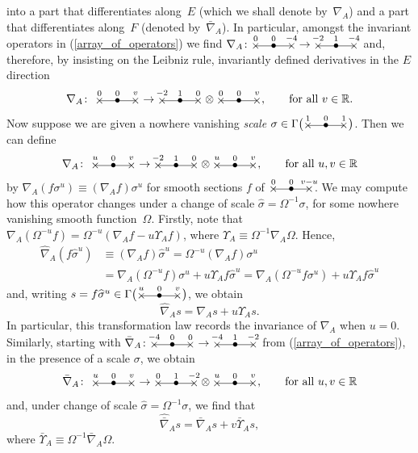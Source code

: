 \documentclass[10pt,a4paper]{amsart}
\numberwithin{equation}{section}
\newcommand{\xox}[3]{\begin{picture}(40,11)
\put(4,1.5){\makebox(0,0){$\times$}}
\put(20,1.5){\makebox(0,0){$\bullet$}}
\put(36,1.5){\makebox(0,0){$\times$}}
\put(4,1.5){\line(1,0){32}}
\put(4,8){\makebox(0,0){$\scriptstyle #1$}}
\put(20,8){\makebox(0,0){$\scriptstyle #2$}}
\put(36,8){\makebox(0,0){$\scriptstyle #3$}}
\end{picture}}
\begin{document}
into a part that differentiates along~$E$ (which we shall denote by~$\nabla_A$)
and a part that differentiates along~$F$ (denoted by~$\bar\nabla_A$). In
particular, amongst the invariant operators in (\ref{array_of_operators}) we
find $\nabla_A\colon \xox{0}{0}{-4}\to\xox{-2}{1}{-4}$ and, therefore, by insisting
on the Leibniz rule, invariantly defined derivatives in the $E$ direction
\[\nabla_A\colon \ \xox{0}{0}{v}\to\xox{-2}{1}{0}\otimes\xox{0}{0}{v},\qquad
\mbox{for all}\ v\in{\mathbb{R}}.\]
Now suppose we are given a nowhere vanishing {\em scale}
$\sigma\in\Gamma\big(\xox{1}{0}{1}\big)$. Then we can define
\begin{align}\label{densities}
\nabla_A\colon \ \xox{u}{0}{v} \to \xox{-2}{1}{0} \otimes \xox{u}{0}{v},\qquad
\mbox{for all}\ u,v\in{\mathbb{R}}
\end{align}
by $\nabla_A(f\sigma^u)\equiv(\nabla_A f)\sigma^u$ for smooth sections $f$ of
$\xox{0}{0}{v-u}$\;. We may compute how this operator changes under a change of
scale $\widehat\sigma=\Omega^{-1}\sigma$, for some nowhere vanishing
smooth function~$\Omega$. Firstly, note that
$\nabla_A(\Omega^{-u}f)=\Omega^{-u}(\nabla_A f-u\Upsilon_Af)$, where
$\Upsilon_A\equiv\Omega^{-1}\nabla_A\Omega$.
Hence,
\begin{align*}
\widehat\nabla_A(f\widehat\sigma^u)& \equiv (\nabla_A f)\widehat\sigma^u=
\Omega^{-u}(\nabla_A f)\sigma^u\\
& = \nabla_A(\Omega^{-u}f)\sigma^u+u\Upsilon_Af\widehat\sigma^u
=\nabla_A(\Omega^{-u}f\sigma^u)+u\Upsilon_Af\widehat\sigma^u
\end{align*}
and, writing $s=f\widehat\sigma^u\in\Gamma\big(\xox{u}{0}{v}\big)$, we obtain
\[\widehat\nabla_A s=\nabla_A s+u\Upsilon_As.\]
In particular, this transformation law records the invariance of $\nabla_A$
when $u=0$. Similarly, starting with
$\bar\nabla_A\colon \xox{-4}{0}{0}\to\xox{-4}{1}{-2}$ from
(\ref{array_of_operators}), in the presence of a scale $\sigma$, we obtain
\[\bar\nabla_A\colon \ \xox{u}{0}{v}\to\xox{0}{1}{-2}\otimes\xox{u}{0}{v},
\qquad\mbox{for all}\ u,v\in{\mathbb{R}}\]
and, under change of scale $\widehat\sigma=\Omega^{-1}\sigma$, we find
that
\[\widehat{\bar\nabla}_As=\bar\nabla_A s+v\bar\Upsilon_As,\]
where $\bar\Upsilon_A\equiv\Omega^{-1}\bar\nabla_A\Omega$.
\end{document}
